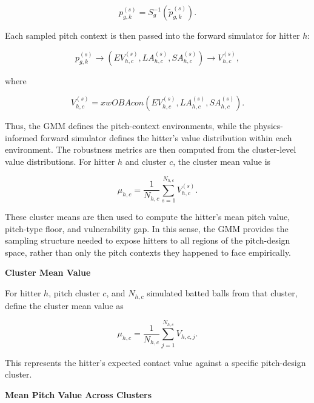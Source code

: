 \documentclass[11pt]{article}
\begin{document}
\begin{equation}
    p^{(s)}_{g,k}
    =
    S_g^{-1}
    \left(
        \tilde{p}^{(s)}_{g,k}
    \right).
\end{equation}

Each sampled pitch context is then passed into the forward simulator for hitter \(h\):

\begin{equation}
    p^{(s)}_{g,k}
    \longrightarrow
    (EV^{(s)}_{h,c}, LA^{(s)}_{h,c}, SA^{(s)}_{h,c})
    \longrightarrow
    V^{(s)}_{h,c},
\end{equation}

where

\begin{equation}
    V^{(s)}_{h,c}
    =
    xwOBAcon
    \left(
        EV^{(s)}_{h,c},
        LA^{(s)}_{h,c},
        SA^{(s)}_{h,c}
    \right).
\end{equation}

Thus, the GMM defines the pitch-context environments, while the physics-informed forward simulator defines the hitter's value distribution within each environment. The robustness metrics are then computed from the cluster-level value distributions. For hitter \(h\) and cluster \(c\), the cluster mean value is

\begin{equation}
    \mu_{h,c}
    =
    \frac{1}{N_{h,c}}
    \sum_{s=1}^{N_{h,c}}
    V^{(s)}_{h,c}.
\end{equation}

These cluster means are then used to compute the hitter's mean pitch value, pitch-type floor, and vulnerability gap. In this sense, the GMM provides the sampling structure needed to expose hitters to all regions of the pitch-design space, rather than only the pitch contexts they happened to face empirically.

\textbf{Cluster Mean Value}

For hitter \(h\), pitch cluster \(c\), and \(N_{h,c}\) simulated batted balls from that cluster, define the cluster mean value as

\begin{equation}
\mu_{h,c}
=
\frac{1}{N_{h,c}}
\sum_{j=1}^{N_{h,c}}
V_{h,c,j}.
\end{equation}

This represents the hitter's expected contact value against a specific pitch-design cluster.

\textbf{Mean Pitch Value Across Clusters}
\end{document}
